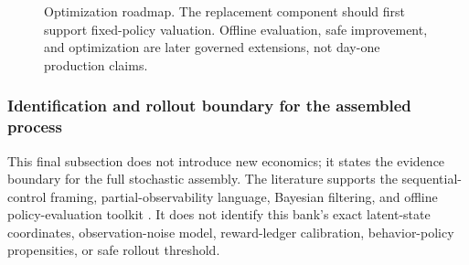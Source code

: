 \documentclass[11pt]{article}
\newcommand{\1}{\mathbf{1}}
\begin{document}
\begin{figure}[t]
\centering
{}
\caption{Optimization roadmap. The replacement component should first support
fixed-policy valuation. Offline evaluation, safe improvement, and optimization
are later governed extensions, not day-one production claims.}
\label{fig:rl-roadmap}
\end{figure}

\subsubsection{Identification and rollout boundary for the assembled process}
\label{subsec:state-space-identification-boundary}

This final subsection does not introduce new economics; it states the evidence
boundary for the full stochastic assembly. The literature supports the
sequential-control framing, partial-observability language, Bayesian filtering,
and offline policy-evaluation toolkit
\citep{puterman1994mdp,murphy2003dynamic,smallwood1973pomdp,kaelbling1998pomdp,
trench2003bankone,durbinkoopman2012ssm,westharrison1997bfdm,doucet2001smc,
jiangli2016dr,huwager2021pomdpope,laroche2019spibb,
khraishiokhrati2022offlinecredit,chehrazi2015dynamicvaluation,
chehrazi2019collections}. It does not identify this bank's exact latent-state
coordinates, observation-noise model, reward-ledger calibration,
behavior-policy propensities, or safe rollout threshold.
\end{document}
